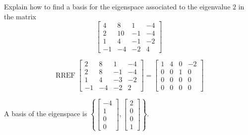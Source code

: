
\begin{exerciseStatement}


Explain how to find a basis for the eigenspace associated to the eigenvalue \( 2 \) in the matrix \[ \left[\begin{array}{cccc}
4 & 8 & 1 & -4 \\
2 & 10 & -1 & -4 \\
1 & 4 & -1 & -2 \\
-1 & -4 & -2 & 4
\end{array}\right] \]


\end{exerciseStatement}
    
\begin{exerciseAnswer} 


\[\operatorname{RREF} \left[\begin{array}{cccc}
2 & 8 & 1 & -4 \\
2 & 8 & -1 & -4 \\
1 & 4 & -3 & -2 \\
-1 & -4 & -2 & 2
\end{array}\right] = \left[\begin{array}{cccc}
1 & 4 & 0 & -2 \\
0 & 0 & 1 & 0 \\
0 & 0 & 0 & 0 \\
0 & 0 & 0 & 0
\end{array}\right] \]



A basis of the eigenspace is \( \left\{ \left[\begin{array}{c}
-4 \\
1 \\
0 \\
0
\end{array}\right] , \left[\begin{array}{c}
2 \\
0 \\
0 \\
1
\end{array}\right] \right\} \).


\end{exerciseAnswer}
    
